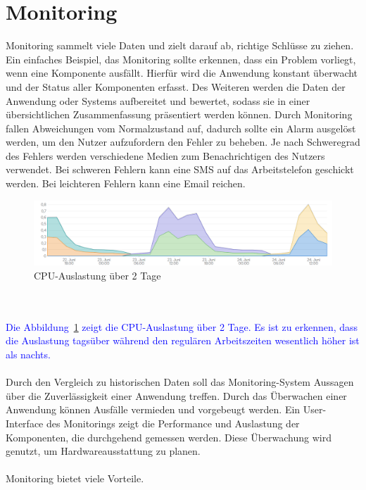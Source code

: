 \section{Monitoring}\label{sec:monitoring}
Monitoring sammelt viele Daten und zielt darauf ab, richtige Schlüsse zu ziehen.
Ein einfaches Beispiel, das Monitoring sollte erkennen, dass ein Problem vorliegt, wenn eine Komponente ausfällt.
Hierfür wird die Anwendung konstant überwacht und der Status aller Komponenten erfasst.
Des Weiteren werden die Daten der Anwendung oder Systems aufbereitet und bewertet, sodass sie in einer übersichtlichen Zusammenfassung präsentiert werden können.
Durch Monitoring fallen Abweichungen vom Normalzustand auf, dadurch sollte ein Alarm ausgelöst werden, um den Nutzer aufzufordern den Fehler zu beheben.
Je nach Schweregrad des Fehlers werden verschiedene Medien zum Benachrichtigen des Nutzers verwendet.
Bei schweren Fehlern kann eine SMS auf das Arbeitstelefon geschickt werden.
Bei leichteren Fehlern kann eine Email reichen.\autocite{cloudradar, crossmedia}
\\
\begin{figure}[!h]
    \centering
    \includegraphics[width=\linewidth]{images/cpu-ozv-web2}
    \caption{CPU-Auslastung über 2 Tage}\label{fig:figure}
\end{figure}
\\
\\
\textcolor{blue}{
    Die Abbildung~\ref{fig:figure} zeigt die CPU-Auslastung über 2 Tage.
    Es ist zu erkennen, dass die Auslastung tagsüber während den regulären Arbeitszeiten wesentlich höher ist als nachts.
}
\\
\\
Durch den Vergleich zu historischen Daten soll das Monitoring-System Aussagen über die Zuverlässigkeit einer Anwendung treffen.
Durch das Überwachen einer Anwendung können Ausfälle vermieden und vorgebeugt werden.
Ein User-Interface des Monitorings zeigt die Performance und Auslastung der Komponenten, die durchgehend gemessen werden.
Diese Überwachung wird genutzt, um Hardwareausstattung zu planen.\autocite{cloudradar}
\\
\\
Monitoring bietet viele Vorteile.
